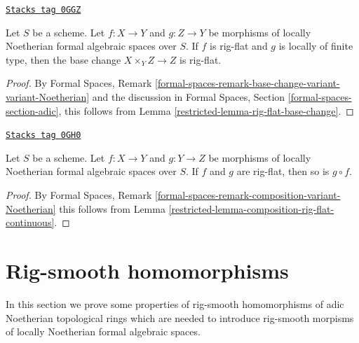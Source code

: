 \begin{lemma}
\label{restricted-lemma-base-change-rig-flat}
\href{https://stacks.math.columbia.edu/tag/0GGZ}{\texttt{Stacks tag 0GGZ}}

Let $S$ be a scheme. Let $f : X \to Y$ and $g : Z \to Y$
be morphisms of locally Noetherian formal algebraic spaces over $S$.
If $f$ is rig-flat and $g$ is locally of finite type, then the base change
$X \times_Y Z \to Z$ is rig-flat.
\end{lemma}

\begin{proof}

By Formal Spaces, Remark
\ref{formal-spaces-remark-base-change-variant-variant-Noetherian}
and the discussion in Formal Spaces, Section
\ref{formal-spaces-section-adic},
this follows from
Lemma \ref{restricted-lemma-rig-flat-base-change}.
\end{proof}

\begin{lemma}
\label{restricted-lemma-composition-rig-flat}
\href{https://stacks.math.columbia.edu/tag/0GH0}{\texttt{Stacks tag 0GH0}}

Let $S$ be a scheme. Let $f : X \to Y$ and $g : Y \to Z$
be morphisms of locally Noetherian formal algebraic spaces over $S$.
If $f$ and $g$ are rig-flat, then so is $g \circ f$.
\end{lemma}

\begin{proof}

By Formal Spaces, Remark
\ref{formal-spaces-remark-composition-variant-Noetherian}
this follows from Lemma \ref{restricted-lemma-composition-rig-flat-continuous}.
\end{proof}

\section{Rig-smooth homomorphisms}
\label{restricted-section-rig-smooth-homomorphisms}
In this section we prove some properties of
rig-smooth homomorphisms of adic Noetherian
topological rings which are needed to introduce
rig-smooth morpisms of locally Noetherian
formal algebraic spaces.

